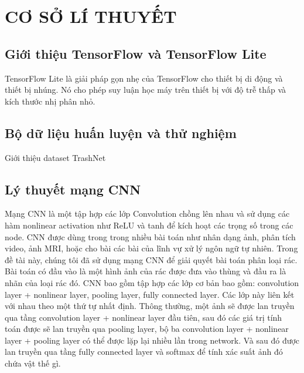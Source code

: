 
\chapter{CƠ SỞ LÍ THUYẾT}



\label{chap:ontology}
\section{Giới thiệu TensorFlow và TensorFlow Lite}
TensorFlow Lite là giải pháp gọn nhẹ của TensorFlow cho thiết bị di động và thiết bị nhúng.
Nó cho phép suy luận học máy trên thiết bị với độ trễ thấp và kích thước nhị phân nhỏ.



\section{Bộ dữ liệu huấn luyện và thử nghiệm}


Giới thiệu dataset TrashNet \cite{trashnet}


\section{Lý thuyết mạng CNN}
Mạng CNN là một tập hợp các lớp Convolution chồng lên nhau và sử dụng các hàm nonlinear activation như ReLU và tanh để kích hoạt các trọng số trong các node. CNN được dùng trong trong nhiều bài toán như nhân dạng ảnh, phân tích video, ảnh MRI, hoặc cho bài các bài của lĩnh vự xử lý ngôn ngữ tự nhiên. Trong đề tài này, chúng tôi đã sử dụng mạng CNN để giải quyết bài toán phân loại rác.
Bài toán có đầu vào là một hình ảnh của rác được đưa vào thùng và đầu ra là nhãn của loại rác đó.
CNN bao gồm tập hợp các lớp cơ bản bao gồm: convolution layer + nonlinear layer, pooling layer, fully connected layer. 
Các lớp này liên kết với nhau theo một thứ tự nhất định. 
Thông thường, một ảnh sẽ được lan truyền qua tầng convolution layer + nonlinear layer đầu tiên, sau đó các giá trị tính toán được sẽ lan truyền qua pooling layer, bộ ba convolution layer + nonlinear layer + pooling layer có thể được lặp lại nhiều lần trong network. Và sau đó được lan truyền qua tầng fully connected layer và softmax để tính xác suất ảnh đó chứa vật thế gì.

